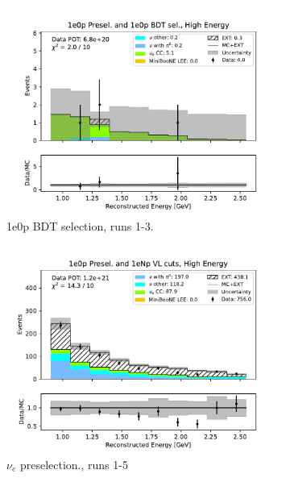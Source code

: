 \begin{figure}[H]
\begin{subfigure}{0.33\linewidth}
    \includegraphics[width=\linewidth]{technote/Sidebands/Figures/FarSideband/far_sideband_reco_e_run123_ZP_ZPBDT_HIGH_ENERGY.pdf}
    \caption{1e0p BDT selection, runs 1-3.}
    \end{subfigure}
    \begin{subfigure}{0.33\linewidth}
    \includegraphics[width=\linewidth]{technote/Sidebands/Figures/FarSideband/far_sideband_reco_e_run1234a4b4c4d5_ZP_ZP_HIGH_ENERGY.pdf}
    \caption{$\nu_e$ preselection., runs 1-5}
    \end{subfigure}%
    \begin{subfigure}{0.33\linewidth}

\end{subfigure}
\end{figure}
